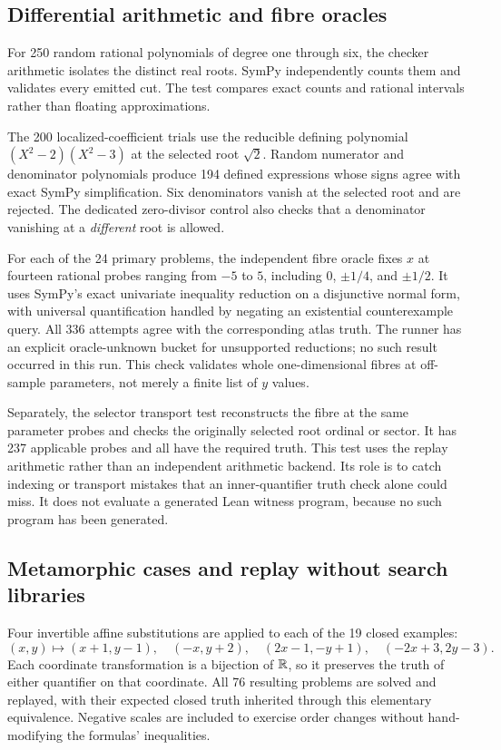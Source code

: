 \subsection{Differential arithmetic and fibre oracles}
For 250 random rational polynomials of degree one through six, the checker arithmetic isolates the distinct real roots. SymPy independently counts them and validates every emitted cut. The test compares exact counts and rational intervals rather than floating approximations.

The 200 localized-coefficient trials use the reducible defining polynomial $(X^2-2)(X^2-3)$ at the selected root $\sqrt2$. Random numerator and denominator polynomials produce 194 defined expressions whose signs agree with exact SymPy simplification. Six denominators vanish at the selected root and are rejected. The dedicated zero-divisor control also checks that a denominator vanishing at a \emph{different} root is allowed.

For each of the 24 primary problems, the independent fibre oracle fixes $x$ at fourteen rational probes ranging from $-5$ to $5$, including $0$, $\pm1/4$, and $\pm1/2$. It uses SymPy's exact univariate inequality reduction on a disjunctive normal form, with universal quantification handled by negating an existential counterexample query. All 336 attempts agree with the corresponding atlas truth. The runner has an explicit oracle-unknown bucket for unsupported reductions; no such result occurred in this run. This check validates whole one-dimensional fibres at off-sample parameters, not merely a finite list of $y$ values.

Separately, the selector transport test reconstructs the fibre at the same parameter probes and checks the originally selected root ordinal or sector. It has 237 applicable probes and all have the required truth. This test uses the replay arithmetic rather than an independent arithmetic backend. Its role is to catch indexing or transport mistakes that an inner-quantifier truth check alone could miss. It does not evaluate a generated Lean witness program, because no such program has been generated.

\subsection{Metamorphic cases and replay without search libraries}
Four invertible affine substitutions are applied to each of the 19 closed examples:
\[
 (x,y)\mapsto(x+1,y-1),\quad(-x,y+2),\quad
 (2x-1,-y+1),\quad(-2x+3,2y-3).
\]
Each coordinate transformation is a bijection of $\mathbb R$, so it preserves the truth of either quantifier on that coordinate. All 76 resulting problems are solved and replayed, with their expected closed truth inherited through this elementary equivalence. Negative scales are included to exercise order changes without hand-modifying the formulas' inequalities.

